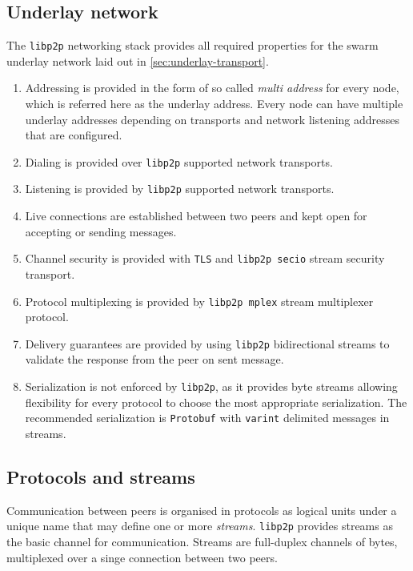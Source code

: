 
\subsection{Underlay network \statusgreen}

The \lstinline{libp2p} networking stack provides all required properties for the swarm underlay network laid out in \ref{sec:underlay-transport}.

\begin{enumerate}
\item Addressing is provided in the form of so called \emph{multi address} for every node, which is referred here as the underlay address. Every node can have multiple underlay addresses depending on transports and network listening addresses that are configured.
\item Dialing is provided over \lstinline{libp2p} supported network transports.
\item Listening is provided by \lstinline{libp2p} supported network transports.
\item Live connections are established between two peers and kept open for accepting or sending messages.
\item Channel security is provided with \lstinline{TLS} and \lstinline{libp2p secio} stream security transport.
\item Protocol multiplexing is provided by \lstinline{libp2p mplex} stream multiplexer protocol.
\item Delivery guarantees are provided by using \lstinline{libp2p} bidirectional streams to validate the response from the peer on sent message.
\item Serialization is not enforced by \lstinline{libp2p}, as it provides byte streams allowing flexibility for every protocol to choose the most appropriate serialization. The recommended serialization is \lstinline{Protobuf} with \lstinline{varint} delimited messages in streams.
\end{enumerate}

\subsection{Protocols and streams \statusgreen}

Communication between peers is organised in protocols as logical units under a unique name that may define one or more \emph{streams}. \lstinline{libp2p} provides streams as the basic channel for communication. Streams are full-duplex channels of bytes, multiplexed over a singe connection between two peers.

